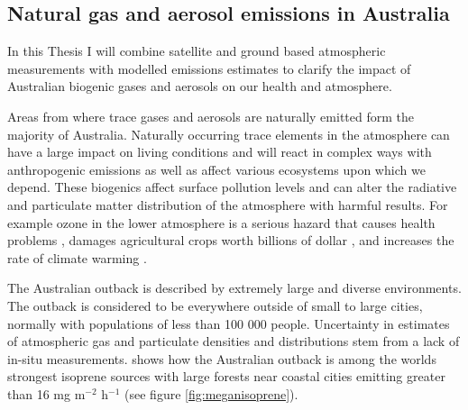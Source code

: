 \subsection{Natural gas and aerosol emissions in Australia}

In this Thesis I will combine satellite and ground based atmospheric measurements with modelled emissions estimates to clarify the impact of Australian biogenic gases and aerosols on our health and atmosphere.

Areas from where trace gases and aerosols are naturally emitted form the majority of Australia.
Naturally occurring trace elements in the atmosphere can have a large impact on living conditions and will react in complex ways with anthropogenic emissions as well as affect various ecosystems upon which we depend.
These biogenics affect surface pollution levels and can alter the radiative and particulate matter distribution of the atmosphere with harmful results.
For example ozone in the lower atmosphere is a serious hazard that causes health problems \cite{Hsieh_2013}, damages agricultural crops worth billions of dollar \cite{Avnery_2011}, and increases the rate of climate warming \cite{IPCC_2013_chap8}.

The Australian outback is described by extremely large and diverse environments. 
The outback is considered to be everywhere outside of small to large cities, normally with populations of less than 100 000 people.
Uncertainty in estimates of atmospheric gas and particulate densities and distributions stem from a lack of in-situ measurements.
\citet{Guenther_2006} shows how the Australian outback is among the worlds strongest isoprene sources with large forests near coastal cities emitting greater than 16 mg m$^{-2}$ h$^{-1}$ (see figure \ref{fig:meganisoprene}).

  